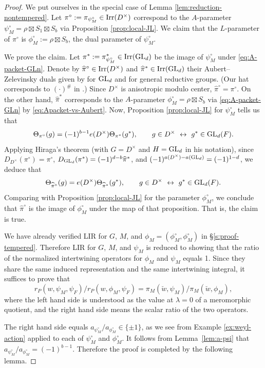 \documentclass[11pt,reqno]{amsart}
\theoremstyle{plain}
\theoremstyle{definition}
\newcommand{\GL}{\tu{GL}}
\newcommand{\Irr}{\tu{Irr}}
\newcommand{\tu}{\textup}
\renewcommand{\hat}{\widehat}
\numberwithin{equation}{subsection}
\begin{document}
\begin{proof}
We put ourselves in the special case of Lemma \ref{lem:reduction-nontempered}. Let $\pi^\circ:=\pi_{\psi^\circ_M}\in \Irr(D^\times)$ correspond to the $A$-parameter $\psi^\circ_M=\rho \boxtimes S_1\boxtimes S_b$ via Proposition \ref{prop:local-JL}. We claim that the $L$-parameter of $\pi^\circ$ is $\phi^\circ_M:=\rho\boxtimes S_b$, the dual parameter of $\psi^\circ_M$. 

We prove the claim. Let $\pi^*:=\pi^*_{\psi^\circ_M}\in \Irr(\GL_d)$ be the image of $\psi^\circ_M$ under \eqref{eq:A-packet-GLn}.
Denote by $\hat \pi^\circ\in \Irr(D^\times)$ and $\hat \pi^*\in \Irr(\GL_d)$ their Aubert--Zelevinsky duals given by \cite{Zel80} for $\GL_d$ and \cite{Aubert} for general reductive groups. (Our hat corresponds to $(\cdot)^\#$ in \cite{Aubert}.) Since $D^\times$ is anisotropic modulo center, $\hat \pi^\circ=\pi^\circ$. On the other hand, $\hat \pi^{*}$ corresponds to the $A$-parameter $\phi^\circ_M=\rho\boxtimes S_b$ via \eqref{eq:A-packet-GLn} by \eqref{eq:Apacket-vs-Aubert}.
Now, Proposition \ref{prop:local-JL} for $\psi_M^\circ$ tells us that
\[
\Theta_{\pi^\circ}(g)= (-1)^{b-1} e(D^\times) \Theta_{\pi^{*}}(g^*), \qquad g\in D^\times ~\leftrightarrow~ g^*\in \GL_d(F).
\]
Applying Hiraga's theorem \cite[Thm.~1.5]{Hiraga} (with $G=D^\times$ and $H=\GL_d$ in his notation), since $D_{D^\times}(\pi^\circ)= \pi^\circ$, $D_{\GL_d}(\pi^{*})=(-1)^{d-b}\hat \pi^{*}$, and $(-1)^{a(D^\times)-a(\GL_d)}=(-1)^{1-d}$, we deduce that
\[
\Theta_{\hat \pi^\circ}(g)= e(D^\times) \Theta_{\hat \pi^{*}}(g^*), \qquad g\in D^\times ~\leftrightarrow~ g^*\in \GL_d(F).
\]
Comparing with Proposition \ref{prop:local-JL} for the parameter $\phi^\circ_M$, we conclude that $\hat \pi^\circ$ is the image of $\phi^\circ_M$ under the map of that proposition. That is, the claim is true.

We have already verified LIR for $G$, $M$, and $\phi_M=(\phi^\circ_M,\phi^\circ_M)$ in \S\ref{s:proof-tempered}. Therefore LIR for $G$, $M$, and $\psi_M$ is reduced to showing that the ratio of the normalized intertwining operators for $\phi_M$ and $\psi_M$ equals 1. Since they share the same induced representation and the same intertwining integral, it suffices to prove that
\begin{equation}\label{eq:ratios-equal}
    r_P(w,\psi_{M},\psi_F)/r_P(w,\phi_M,\psi_F)=\pi_M(\breve{w},\psi_M)/\pi_M(\breve{w},\phi_M),
\end{equation}
where 
the left hand side is understood as the value at $\lambda = 0$ of a meromorphic quotient, and 
the right hand side means the scalar ratio of the two operators. 

The right hand side equals $a_{\psi_M^\circ}/a_{\phi_M^\circ}\in\{\pm1\}$, as we see from Example \ref{ex:weyl-action} applied to each of $\psi_M^\circ$ and $\phi_M^\circ$. It follows from Lemma~\ref{lem:a-psi} that $a_{\psi_M^\circ}/a_{\phi_M^\circ}=(-1)^{b-1}$.
Therefore the proof is completed by the following lemma.
\end{proof}
\end{document}
